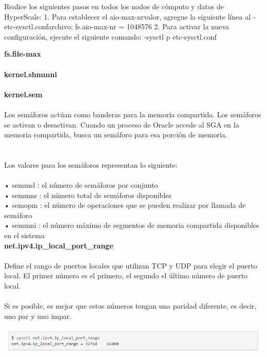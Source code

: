 Realice los siguientes pasos en todos los nodos de cómputo y datos de HyperScale:
1.	Para establecer el aio-max-nrvalor, agregue la siguiente línea al -etc-sysctl.confarchivo:
 fs.aio-max-nr = 1048576
2.	Para activar la nueva configuración, ejecute el siguiente comando:
 -sysctl p etc-sysctl.conf

{\bfseries fs.file-max}
\\
\\

{\bfseries kernel.shmmni}
\\
\\

{\bfseries  kernel.sem}
\\
\\Los semáforos actúan como banderas para la memoria compartida. Los semáforos se activan o desactivan. Cuando un proceso de Oracle accede al SGA en la memoria compartida, busca un semáforo para esa porción de memoria. \\
\\
\\Los valores para los semáforos representan lo siguiente:\\
\\•	semmsl : el número de semáforos por conjunto
\\•	semmns : el número total de semáforos disponibles
\\•	semopm : el número de operaciones que se pueden realizar por llamada de semáforo
\\•	semmni : el número máximo de segmentos de memoria compartida disponibles en el sistema
\\

{\bfseries  net.ipv4.ip\_local\_port\_range}
\\
\\Define el rango de puertos locales que utilizan TCP y UDP para elegir el puerto local. El primer número es el primero, el segundo el último número de puerto local. \\
\\Si es posible, es mejor que estos números tengan una paridad diferente, es decir, uno par y uno impar. 
\\
	\begin{center}
		\includegraphics[width=17cm]{./Imagenes/c} 
	\end{center} 

